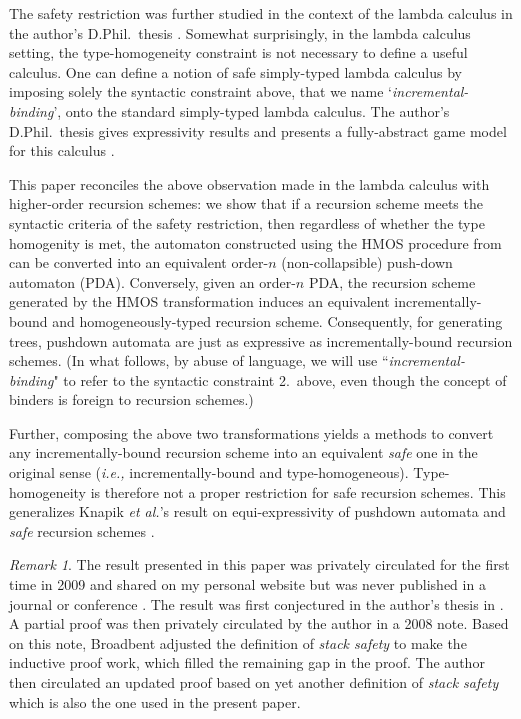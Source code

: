 \documentclass[a4paper]{article}[12pt]
\theoremstyle{remark}
\newtheorem{remark}{Remark}[section]
\theoremstyle{definition}
\begin{document}
The safety restriction was further studied in the context of the lambda calculus
in the author's D.Phil.\ thesis \cite{BlumPhd}. Somewhat surprisingly, in the
lambda calculus setting, the type-homogeneity constraint is not necessary to
define a useful calculus. One can define a notion of safe simply-typed lambda
calculus by imposing solely the syntactic constraint above, that we name
`\emph{incremental-binding}', onto the standard simply-typed lambda calculus.
The author's D.Phil.\ thesis gives expressivity results and presents a fully-abstract game
model for this calculus \cite{BlumPhd}.

This paper reconciles the above observation made in the lambda calculus with higher-order recursion schemes: we show that if a recursion scheme meets the syntactic criteria of the safety restriction, then regardless of whether the type homogenity is met, the automaton constructed using the HMOS procedure from \cite{hmos-lics08} can be converted into an equivalent order-$n$ (non-collapsible) push-down automaton (PDA). Conversely, given an order-$n$ PDA, the recursion scheme generated by the HMOS transformation induces an equivalent incrementally-bound and homogeneously-typed recursion scheme.
Consequently, for generating trees, pushdown automata are just as expressive as incrementally-bound recursion schemes.
(In what follows, by abuse of language, we will use ``\emph{incremental-binding}" to refer to the syntactic constraint 2.\ above, even though the concept of binders is foreign to recursion schemes.)

Further, composing the above two transformations yields a methods to
convert any incrementally-bound recursion scheme into an equivalent \emph{safe} one in the original sense ({\it i.e.,} incrementally-bound and type-homogeneous). Type-homogeneity is therefore not a proper restriction for safe recursion schemes. This generalizes Knapik \emph{et al.}'s result on equi-expressivity of pushdown automata and \emph{safe} recursion schemes \cite{KNU02}.
\vspace{1em}

\begin{remark}
The result presented in this paper was privately circulated for the first time in 2009 and shared on my personal website but was never published in a journal or conference \cite{blum-safehomogeneity-note}.
The result was first conjectured in the author's thesis in \cite{BlumPhd}. A partial proof was then privately circulated by the author in a 2008 note. Based on this note, Broadbent \cite{Broadbent2009} adjusted the definition of \emph{stack safety} to make the inductive proof work, which filled the remaining gap in the proof. The author then circulated an updated proof based on yet another definition of \emph{stack safety} which is also the one used in the present paper.
\end{remark}
\end{document}
